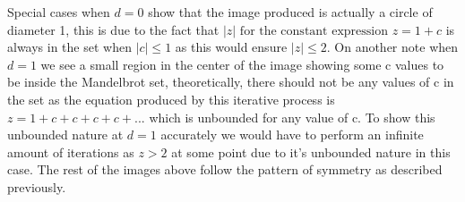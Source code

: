 \documentclass[a4wide, 10pt]{article}
\begin{document}
Special cases when $d = 0$ show that the image produced is actually a circle of diameter 1, this is due
 to the fact that $|z| \textrm{ for the constant expression } z = 1 + c$ is always in the set when $|c|
  \leq 1$ as this would ensure $|z| \leq 2$. On another note when $d = 1$ we see a small region in the
   center of the image showing some c values to be inside the Mandelbrot set, theoretically, there
    should not be any values of c in the set as the equation produced by this iterative process is $z =
     1 + c + c + c + c + ...$ which is unbounded for any value of c. To show this unbounded nature at
      $d = 1$ accurately we would have to perform an infinite amount of iterations as $z > 2$ at some
       point due to it's unbounded nature in this case. The rest of the images above follow the pattern
        of symmetry as described previously.







\end{document}
